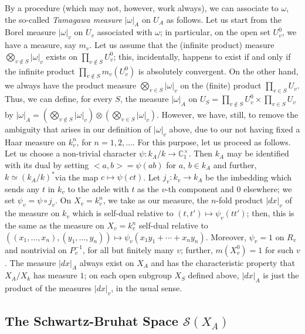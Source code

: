 By a procedure (which may not, however, work always), we can associate
to $\omega$, the so-called {\em Tamagawa measure} $|\omega|_{A}$ on
$U_{A}$ as follows. Let us start from the Borel measure $|\omega|_{v}$
on $U_{v}$ associated with $\omega$; in particular, on the open set
$U^{0}_{v}$, we have a measure, say $m_{v}$. Let us assume that the
(infinite product) measure $\bigotimes\limits_{v\not\in
  S}|\omega|_{v}$ exists on $\prod\limits_{v\not\in S}U^{0}_{v}$;
this, incidentally, happens to exist if and only if the infinite
product $\prod\limits_{v\not\in S}m_{v}(U^{0}_{v})$ is absolutely
convergent. On the other hand, we always have the product measure
$\bigotimes\limits_{v\in S}|\omega|_{v}$ on the (finite) product
$\prod\limits_{v\in S}U_{v}$. Thus, we can define, for every $S$, the
measure $|\omega|_{A}$ on $U_{S}=\prod\limits_{v\not\in
  S}U^{0}_{v}\times \prod_{v\in S}U_{v}$ by
$|\omega|_{A}=(\bigotimes\limits_{v\not\in S}|\omega|_{v})\otimes
(\bigotimes\limits_{v\in S}|\omega|_{v})$. However, we have, still, to
remove the ambiguity that arises in our definition of $|\omega|_{v}$
above, due to our not having fixed a Haar measure on $k^{n}_{v}$, for
$n=1,2,\ldots$. For this purpose, let us proceed as follows. Let us
choose a non-trivial character $\psi:k_{A}/k\to
\mathbb{C}^{\times}_{1}$. Then $k_{A}$ may be identified with its dual
by setting $<a,b>=\psi(ab)$ for $a$, $b\in k_{A}$ and further, 
$k\simeq (k_{A}/k)^{\ast}$\pageoriginale via the map $c\mapsto
\psi(ct)$. Let $j_{v}:k_{v}\to k_{A}$ be the imbedding which sends any
$t$ in $k_{v}$ to the adele with $t$ as the $v$-th component and $0$
elsewhere; we set $\psi_{v}=\psi\circ j_{v}$. On $X_{v}=k^{n}_{v}$, we
take as our measure, the $n$-fold product $|dx|_{v}$ of the measure on
$k_{v}$ which is self-dual relative to $(t,t')\mapsto \psi_{v}(tt')$; 
then, this is the same as the measure on $X_{v}=k^{n}_{v}$ self-dual
relative to $((x_{1},\ldots,x_{n}),(y_{1},\ldots,y_{n}))\mapsto
\psi_{v}(x_{1}y_{1}+\cdots+x_{n}y_{n})$. Moreover, $\psi_{v}=1$ on
$R_{v}$ and nontrivial on $P^{-1}_{v}$, for all but finitely many $v$;
further, $m(X^{0}_{v})=1$ for such $v$. The measure $|dx|_{A}$ always
exist on $X_{A}$ and has the characteristic property that
$X_{A}/X_{k}$ has measure $1$; on each open subgroup $X_{S}$ defined
above, $|dx|_{A}$ is just the product of the measures $|dx|_{v}$, in
the usual sense.

\subsection{The Schwartz-Bruhat Space
  $\mathscr{S}(X_{A})$}\label{chap4:sec1:subsec5} %


